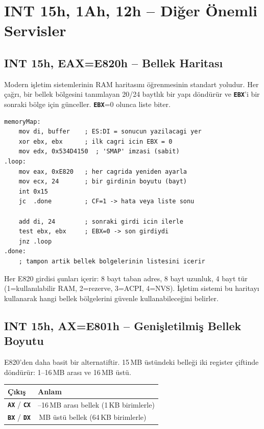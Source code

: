 \documentclass[11pt,a4paper]{article}
\newcommand{\reg}[1]{\texttt{\color{anaMavi}\textbf{#1}}}
\begin{document}
\section{INT 15h, 1Ah, 12h -- Diğer Önemli Servisler}

\subsection{INT 15h, EAX=E820h -- Bellek Haritası}

Modern işletim sistemlerinin RAM haritasını öğrenmesinin standart yoludur.
Her çağrı, bir bellek bölgesini tanımlayan 20/24 baytlık bir yapı döndürür ve
\reg{EBX}'i bir sonraki bölge için günceller. \reg{EBX}=0 olunca liste biter.

\begin{ornekkutu}
\begin{lstlisting}
memoryMap:
    mov di, buffer    ; ES:DI = sonucun yazilacagi yer
    xor ebx, ebx      ; ilk cagri icin EBX = 0
    mov edx, 0x534D4150  ; 'SMAP' imzasi (sabit)
.loop:
    mov eax, 0xE820   ; her cagrida yeniden ayarla
    mov ecx, 24       ; bir girdinin boyutu (bayt)
    int 0x15
    jc  .done         ; CF=1 -> hata veya liste sonu

    add di, 24        ; sonraki girdi icin ilerle
    test ebx, ebx     ; EBX=0 -> son girdiydi
    jnz .loop
.done:
    ; tampon artik bellek bolgelerinin listesini icerir
\end{lstlisting}
\end{ornekkutu}

\begin{bilgikutu}
Her E820 girdisi şunları içerir: 8 bayt taban adres, 8 bayt uzunluk, 4 bayt
tür (1=kullanılabilir RAM, 2=rezerve, 3=ACPI, 4=NVS). İşletim sistemi bu
haritayı kullanarak hangi bellek bölgelerini güvenle kullanabileceğini belirler.
\end{bilgikutu}

\subsection{INT 15h, AX=E801h -- Genişletilmiş Bellek Boyutu}

E820'den daha basit bir alternatiftir. 15\,MB üstündeki belleği iki register
çiftinde döndürür: 1--16\,MB arası ve 16\,MB üstü.

\begin{center}
\begin{tabularx}{\textwidth}{@{}l >{\raggedright\arraybackslash}X@{}}
\toprule
\rowcolor{acikMavi}\color{anaMavi}\textbf{Çıkış} & \color{anaMavi}\textbf{Anlam} \\
\midrule
\reg{AX} / \reg{CX} & 1--16\,MB arası bellek (1\,KB birimlerle) \\
\reg{BX} / \reg{DX} & 16\,MB üstü bellek (64\,KB birimlerle) \\
\bottomrule
\end{tabularx}
\end{center}
\end{document}
